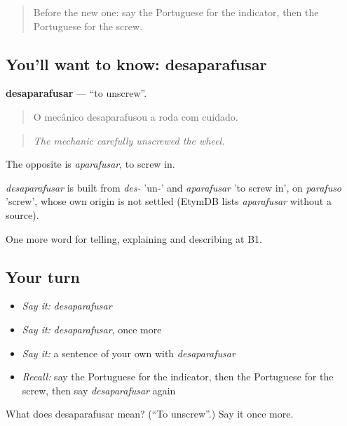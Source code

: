 \label{lesson:PT-C407-desaparafusar}



\begin{quote}
Before the new one: say the Portuguese for the indicator, then the Portuguese for the screw.
\end{quote}

\subsection*{You'll want to know: desaparafusar}
\textbf{desaparafusar} — \textquotedblleft{}to unscrew\textquotedblright{}.

\begin{quote}
O mecânico desaparafusou a roda com cuidado.
\end{quote}

\begin{quote}
\emph{The mechanic carefully unscrewed the wheel.}
\end{quote}

The opposite is \emph{aparafusar}, to screw in.

\begin{cousinweb}
\emph{desaparafusar} is built from \emph{des-} 'un-' and \emph{aparafusar} 'to screw in', on \emph{parafuso} 'screw', whose own origin is not settled (EtymDB lists \emph{aparafusar} without a source).
\end{cousinweb}

\begin{grammarlens}[title={What you've built}]
One more word for telling, explaining and describing at B1.
\end{grammarlens}

\subsection*{Your turn}
\begin{itemize}
\raggedright
  \item \emph{Say it:} \emph{desaparafusar}
  \item \emph{Say it:} \emph{desaparafusar}, once more
  \item \emph{Say it:} a sentence of your own with \emph{desaparafusar}
  \item \emph{Recall:} say the Portuguese for the indicator, then the Portuguese for the screw, then say \emph{desaparafusar} again
\end{itemize}

\begin{tcolorbox}[breakable,colback=teal!4,colframe=teal!35!black,title={Before you move on}]
What does desaparafusar mean? (\textquotedblleft{}To unscrew\textquotedblright{}.) Say it once more.
\end{tcolorbox}
